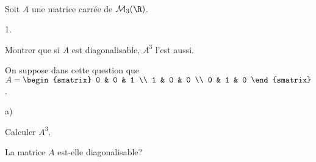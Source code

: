 \documentclass[11pt]{article}%
\begin{document}

\begin{exerciceSP}~\\
  Soit $A$ une matrice carrée de $\mathcal{M}_3 ( \R ) $.
  \begin{noliste}{1.}
    \setlength{\itemsep}{2mm}
  \item Montrer que si $A$ est diagonalisable, $A^3$ l'est aussi.
  \item On suppose dans cette question que $A = 
    \begin{smatrix} 
      0 & 0 & 1 \\ 
      1 & 0 & 0 \\ 
      0 & 1 & 0 
    \end{smatrix}$. 
    \begin{noliste}{a)}
    \setlength{\itemsep}{2mm}
    \item Calculer $A^3$.
    \item La matrice $A$ est-elle diagonalisable?
    \end{noliste}
  \end{noliste}
\end{exerciceSP}


\newpage


\end{document}
